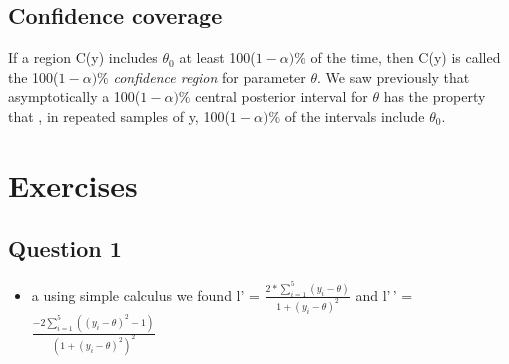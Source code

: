 \documentclass[
]{book}
\providecommand{\tightlist}{%
  \setlength{\itemsep}{0pt}\setlength{\parskip}{0pt}}
\theoremstyle{definition}
\theoremstyle{definition}
\theoremstyle{definition}
\theoremstyle{definition}
\theoremstyle{remark}
\begin{document}
\hypertarget{confidence-coverage}{%
\subsection*{Confidence coverage}\label{confidence-coverage}}

If a region C(y) includes \(\theta_0\) at least 100(\(1-\alpha)\%\) of the time, then C(y) is called the 100(\(1-\alpha)\%\) \emph{confidence region} for parameter \(\theta\). We saw previously that asymptotically a 100(\(1-\alpha)\%\) central posterior interval for \(\theta\) has the property that , in repeated samples of y, 100(\(1-\alpha)\%\) of the intervals include \(\theta_0\).

\hypertarget{exercises-3}{%
\section{Exercises}\label{exercises-3}}

\hypertarget{question-1-2}{%
\subsection*{Question 1}\label{question-1-2}}

\begin{itemize}
\tightlist
\item
  a using simple calculus we found l' = \(\frac{2*\sum_{i=1}^5(y_i-\theta)}{1+(y_i-\theta)^2}\) and l'\,' = \(\frac{-2\sum_{i=1}^5((y_i-\theta)^2-1)}{(1+(y_i-\theta)^2)^2}\)
\end{itemize}
\end{document}
